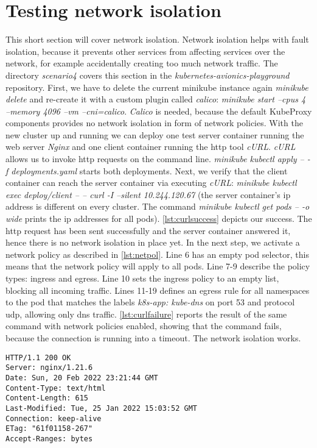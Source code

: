 \documentclass[titlepage]{report}
\begin{document}
\section{Testing network isolation}
This short section will cover network isolation. Network isolation helps with fault isolation, because it prevents other services from affecting services over the network, for example accidentally creating too much network traffic.
The directory \emph{scenario4} covers this section in the \emph{kubernetes-avionics-playground} repository. First, we have to delete the current minikube instance again \emph{minikube delete} and re-create it
with a custom  plugin called \emph{calico}: \emph{minikube start --cpus 4 --memory 4096 --vm --cni=calico}. \emph{Calico} is needed, because the default KubeProxy components provides no network isolation
in form of network policies. With the new cluster up and running we can deploy one test server container running the web server \emph{Nginx} and one client container running the \gls{http} tool \emph{cURL}.
\emph{cURL} allows us to invoke \gls{http} requests on the command line. \emph{minikube kubectl apply -- -f deployments.yaml} starts both deployments. Next, we verify that the client container can reach the server
container via executing \emph{cURL}: \emph{minikube kubectl exec deploy/client -- -- curl -I --silent 10.244.120.67} (the server container's \gls{ip} address is different on every cluster. The command \emph{minikube kubectl get pods -- -o wide} prints the \gls{ip} addresses for all pods).
\autoref{lst:curlsuccess} depicts our success. The \gls{http} request has been sent successfully and the server container answered it, hence there is no network isolation in place yet. In the next step, we activate a network policy as described in \autoref{lst:netpol}.
Line 6 has an empty pod selector, this means that the network policy will apply to all pods. Line 7-9 describe the policy types: ingress and egress. Line 10 sets the ingress policy to an empty list, blocking all incoming traffic.
Lines 11-19 defines an egress rule for all namespaces to the pod that matches the labels \emph{k8s-app: kube-dns} on port 53 and protocol \gls{udp}, allowing only \gls{dns} traffic. \autoref{lst:curlfailure} reports the result
of the same command with network policies enabled, showing that the command fails, because the connection is running into a timeout. The network isolation works.
\begin{minipage}{\linewidth}
\begin{lstlisting}[caption={Snippet of the command \emph{minikube kubectl exec deploy/client -- -- curl -I --silent 10.244.120.67} with network policies disabled},label={lst:curlsuccess}]
HTTP/1.1 200 OK
Server: nginx/1.21.6
Date: Sun, 20 Feb 2022 23:21:44 GMT
Content-Type: text/html
Content-Length: 615
Last-Modified: Tue, 25 Jan 2022 15:03:52 GMT
Connection: keep-alive
ETag: "61f01158-267"
Accept-Ranges: bytes
\end{lstlisting}
\end{minipage}
\end{document}
